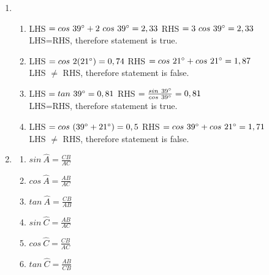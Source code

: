 \begin{solutions}{}
{\begin{enumerate}[itemsep=5pt, label=\textbf{\arabic*}. ]
\begin{multicols}{2}
\end{multicols}
\item %
\begin{enumerate}[noitemsep, label=\textbf{(\alph*)} ]
\item %
    LHS $= cos~39^{\circ} + 2~cos~39^{\circ}\\
	 = 2,33 \\$
    RHS $= 3~cos~39^{\circ}\\
	= 2,33$ \\
LHS=RHS, therefore statement is true.
\item %
    LHS $= cos~2(21^{\circ})\\
	 = 0,74 \\$
    RHS $= cos~21^{\circ}+cos~21^{\circ}\\
	= 1,87$ \\
LHS $\ne$ RHS, therefore statement is false.
\item %
    LHS $= tan~39^{\circ}\\
	 = 0,81 \\$
    RHS $= \frac{sin~39^{\circ}}{cos~39^{\circ}}\\
	= 0,81$ \\
LHS=RHS, therefore statement is true.
\item %
LHS $= cos~(39^{\circ}+21^{\circ})\\
	 = 0,5 \\$
    RHS $= cos~39^{\circ}+cos~21^{\circ}\\
	= 1,71$ \\
LHS $\ne$ RHS, therefore statement is false.
\end{enumerate}

\item %
\begin{multicols}{2}
\begin{enumerate}[itemsep=1pt, label=\textbf{(\alph*)} ]
\item $sin~\hat{A} = \frac{CB}{AC}$
\item $cos~\hat{A} = \frac{AB}{AC}$%
\item $tan~\hat{A} = \frac{CB}{AB}$%
\item $sin~\hat{C} = \frac{AB}{AC}$%
\item $cos~\hat{C} = \frac{CB}{AC}$%
\item $tan~\hat{C} = \frac{AB}{CB}$%
\end{enumerate}


\end{multicols}
\end{enumerate}}
\end{solutions}
